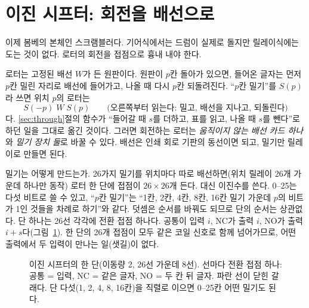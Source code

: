 \section{이진 시프터: 회전을 배선으로}\label{sec:relay-shifter}

이제 봄베의 본체인 스크램블러다. 기어식에서는 드럼이 실제로 돌지만 릴레이식에는 도는 것이 없다. 로터의
회전을 접점으로 흉내 내야 한다.

\Why 로터는 고정된 배선 $W$가 든 원판이다. 원판이 $p$칸 돌아가 있으면, 들어온 글자는 먼저 $p$칸 밀린 자리로
배선에 들어가고, 나올 때 다시 $p$칸 되돌려진다. ``$p$칸 밀기''를 $S(p)$라 쓰면 위치 $p$의 로터는
\[
  S(-p)\;W\;S(p) \qquad\text{(오른쪽부터 읽는다: 밀고, 배선을 지나고, 되돌린다)}
\]
다. \ref{sec:through}절의  함수가 ``들어갈 때 $s$를 더하고, 표를 읽고, 나올 때 $s$를 뺀다''로
하던 일을 그대로 옮긴 것이다.
그러면 회전하는 로터는 \emph{움직이지 않는 배선 카드 하나}와 \emph{밀기 장치 둘}로 바꿀 수 있다. 배선은
인쇄 회로 기판의 동선이면 되고, 밀기만 릴레이로 만들면 된다.

밀기는 어떻게 만드는가. 26가지 밀기를 위치마다 따로 배선하면(위치 릴레이 26개 가운데 하나만 동작) 로터 한
단에 접점이 $26 \times 26$개 든다. 대신 이진수를 쓴다. 0--25는 다섯 비트로 쓸 수 있고, ``$p$칸 밀기''는
``1칸, 2칸, 4칸, 8칸, 16칸 밀기 가운데 $p$의 비트가 1인 것들을 차례로 하기''와 같다. 덧셈은 순서를 바꿔도
되므로 단의 순서는 상관없다. 단 하나는 26선 각각에 전환 접점 하나다. 공통이 입력 $i$, NC가 출력 $i$, NO가
출력 $i+s$다(그림~\ref{fig:r-stage}). 한 단의 26개 접점이 모두 같은 코일 신호로 함께 넘어가므로, 어떤 출력에서
두 입력이 만나는 일(샛길)이 없다.

\begin{figure}[ht]
\centering
{}
\caption{이진 시프터의 한 단(이동량 2, 26선 가운데 8선). 선마다 전환 접점 하나: 공통 = 입력, NC = 같은 글자,
NO = 두 칸 뒤 글자. 파란 선이 닫힌 갈래다. 단 다섯(1, 2, 4, 8, 16칸)을 직렬로 이으면 0--25칸 어떤 밀기도
된다.}
\label{fig:r-stage}
\end{figure}

